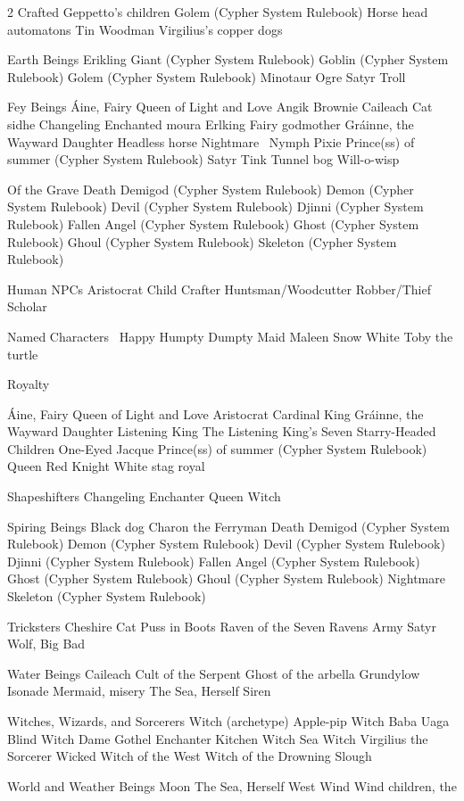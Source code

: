\begin{multicols}{2}
Crafted
Geppetto’s children
Golem (Cypher System Rulebook)
Horse head automatons
Tin Woodman
Virgilius’s copper dogs

Earth Beings
Erikling
Giant (Cypher System Rulebook)
Goblin (Cypher System Rulebook)
Golem (Cypher System Rulebook)
Minotaur
Ogre
Satyr
Troll

Fey Beings
Áine, Fairy Queen of Light and Love
Angik
Brownie
Caileach
Cat sidhe
Changeling
Enchanted moura
Erlking
Fairy godmother
Gráinne, the Wayward Daughter
Headless horse
Nightmare 
Nymph
Pixie
Prince(ss) of summer (Cypher System Rulebook)
Satyr
Tink
Tunnel bog
Will-o-wisp

Of the Grave
Death
Demigod (Cypher System Rulebook)
Demon (Cypher System Rulebook)
Devil (Cypher System Rulebook)
Djinni (Cypher System Rulebook)
Fallen Angel (Cypher System Rulebook)
Ghost (Cypher System Rulebook)
Ghoul (Cypher System Rulebook)
Skeleton (Cypher System Rulebook)

Human NPCs
Aristocrat
Child
Crafter
Huntsman/Woodcutter
Robber/Thief
Scholar

Named Characters 
Happy
Humpty Dumpty
Maid Maleen
Snow White
Toby the turtle

Royalty 

Áine, Fairy Queen of Light and Love
Aristocrat
Cardinal King
Gráinne, the Wayward Daughter
Listening King
The Listening King’s Seven Starry-Headed Children
One-Eyed Jacque
Prince(ss) of summer (Cypher System Rulebook)
Queen
Red Knight
White stag royal

Shapeshifters
Changeling
Enchanter
Queen
Witch

Spiring Beings
Black dog
Charon the Ferryman
Death
Demigod (Cypher System Rulebook)
Demon (Cypher System Rulebook)
Devil (Cypher System Rulebook)
Djinni (Cypher System Rulebook)
Fallen Angel (Cypher System Rulebook)
Ghost (Cypher System Rulebook)
Ghoul (Cypher System Rulebook)
Nightmare
Skeleton (Cypher System Rulebook)

Tricksters
Cheshire Cat
Puss in Boots
Raven of the Seven Ravens Army
Satyr
Wolf, Big Bad

Water Beings
Caileach
Cult of the Serpent
Ghost of the arbella
Grundylow
Isonade
Mermaid, misery
The Sea, Herself
Siren

Witches, Wizards, and Sorcerers
Witch (archetype)
Apple-pip Witch
Baba Uaga
Blind Witch
Dame Gothel
Enchanter
Kitchen Witch
Sea Witch
Virgilius the Sorcerer
Wicked Witch of the West
Witch of the Drowning Slough

World and Weather Beings
Moon
The Sea, Herself
West Wind
Wind children, the


\end{multicols}
